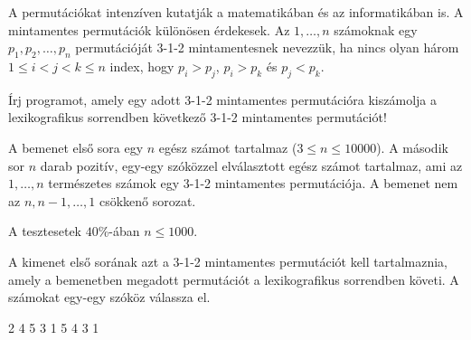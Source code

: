 





A permutációkat intenzíven kutatják a matematikában és az informatikában is. A mintamentes permutációk különösen érdekesek. Az $1,\ldots, n$ számoknak egy $p_1,p_2, \ldots, p_n$ permutációját 3-1-2 mintamentesnek nevezzük, ha nincs olyan három $1\leq i<j<k \leq n$ index, hogy $p_i>p_j$, $p_i>p_k$ és $p_j<p_k$.

Írj programot, amely egy adott 3-1-2 mintamentes permutációra kiszámolja a lexikografikus sorrendben következő 3-1-2 mintamentes permutációt!

A bemenet első sora egy $n$ egész számot tartalmaz ($3 \leq n \leq 10000$). A második sor $n$ darab pozitív, egy-egy szóközzel elválasztott egész számot tartalmaz, ami az $1, \ldots, n$ természetes számok egy 3-1-2 mintamentes permutációja. A bemenet nem az $n,n-1,\ldots ,1$ csökkenő sorozat.

A tesztesetek $40\%$-ában $n \leq 1000$.

A kimenet első sorának azt a 3-1-2 mintamentes permutációt kell tartalmaznia, amely a bemenetben megadott permutációt a lexikografikus sorrendben követi. A számokat egy-egy szóköz válassza el.


2 4 5 3 1
 5 4 3 1
\sampleCOMMENT

\sampleEND


